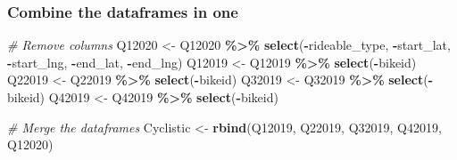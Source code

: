\documentclass[
]{article}
\newenvironment{Shaded}{\begin{snugshade}}{\end{snugshade}}
\newcommand{\AttributeTok}[1]{\textcolor[rgb]{0.13,0.29,0.53}{#1}}
\newcommand{\CommentTok}[1]{\textcolor[rgb]{0.56,0.35,0.01}{\textit{#1}}}
\newcommand{\ConstantTok}[1]{\textcolor[rgb]{0.56,0.35,0.01}{#1}}
\newcommand{\FunctionTok}[1]{\textcolor[rgb]{0.13,0.29,0.53}{\textbf{#1}}}
\newcommand{\NormalTok}[1]{#1}
\newcommand{\OtherTok}[1]{\textcolor[rgb]{0.56,0.35,0.01}{#1}}
\newcommand{\SpecialCharTok}[1]{\textcolor[rgb]{0.81,0.36,0.00}{\textbf{#1}}}
\newcommand{\StringTok}[1]{\textcolor[rgb]{0.31,0.60,0.02}{#1}}
\begin{document}
\hypertarget{combine-the-dataframes-in-one}{%
\subsubsection{Combine the dataframes in
one}\label{combine-the-dataframes-in-one}}

\begin{Shaded}
\begin{Highlighting}[]
\CommentTok{\# Remove columns}
\NormalTok{Q12020 }\OtherTok{\textless{}{-}}\NormalTok{ Q12020 }\SpecialCharTok{\%\textgreater{}\%}
  \FunctionTok{select}\NormalTok{(}\SpecialCharTok{{-}}\NormalTok{rideable\_type, }\SpecialCharTok{{-}}\NormalTok{start\_lat, }\SpecialCharTok{{-}}\NormalTok{start\_lng, }\SpecialCharTok{{-}}\NormalTok{end\_lat, }\SpecialCharTok{{-}}\NormalTok{end\_lng)}
\NormalTok{Q12019 }\OtherTok{\textless{}{-}}\NormalTok{ Q12019 }\SpecialCharTok{\%\textgreater{}\%}
  \FunctionTok{select}\NormalTok{(}\SpecialCharTok{{-}}\NormalTok{bikeid)}
\NormalTok{Q22019 }\OtherTok{\textless{}{-}}\NormalTok{ Q22019 }\SpecialCharTok{\%\textgreater{}\%}
  \FunctionTok{select}\NormalTok{(}\SpecialCharTok{{-}}\NormalTok{bikeid)}
\NormalTok{Q32019 }\OtherTok{\textless{}{-}}\NormalTok{ Q32019 }\SpecialCharTok{\%\textgreater{}\%}
  \FunctionTok{select}\NormalTok{(}\SpecialCharTok{{-}}\NormalTok{bikeid)}
\NormalTok{Q42019 }\OtherTok{\textless{}{-}}\NormalTok{ Q42019 }\SpecialCharTok{\%\textgreater{}\%}
  \FunctionTok{select}\NormalTok{(}\SpecialCharTok{{-}}\NormalTok{bikeid)}
\end{Highlighting}
\end{Shaded}

\begin{Shaded}
\end{Shaded}

\begin{Shaded}
\begin{Highlighting}[]
\CommentTok{\# Merge the dataframes}
\NormalTok{Cyclistic }\OtherTok{\textless{}{-}} \FunctionTok{rbind}\NormalTok{(Q12019, Q22019, Q32019, Q42019, Q12020)}
\end{Highlighting}
\end{Shaded}
\end{document}
